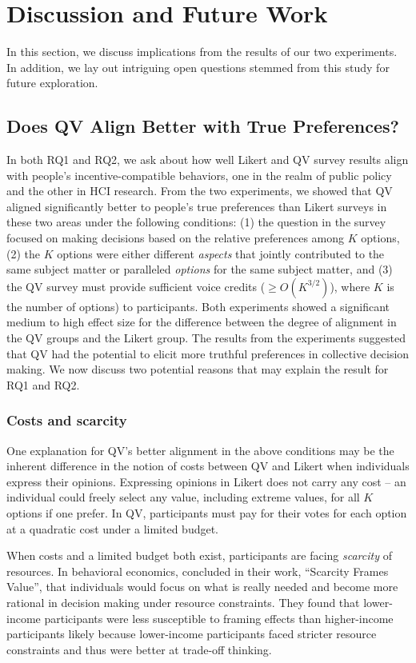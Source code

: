 \section{Discussion and Future Work} \label{discussion}
In this section, we discuss implications from the results of our two experiments. In addition, we lay out intriguing open questions stemmed from this study for future exploration.

\subsection{Does QV Align Better with True Preferences?}
In both RQ1 and RQ2, we ask about how well Likert and QV survey results align with people's incentive-compatible behaviors, one in the realm of public policy and the other in HCI research. From the two experiments, we showed that QV aligned significantly better to people's true preferences than Likert surveys in these two areas under the following conditions: (1) the question in the survey focused on making decisions based on the relative preferences among $K$ options, (2) the $K$ options were either different \textit{aspects} that jointly contributed to the same subject matter or paralleled \textit{options} for the same subject matter, and (3) the QV survey must provide sufficient voice credits ($\geq O(K^{3/2})$), where $K$ is the number of options) to participants. Both experiments showed a significant medium to high effect size for the difference between the degree of alignment in the QV groups and the Likert group. The results from the experiments suggested that QV had the potential to elicit more truthful preferences in collective decision making. We now discuss two potential reasons that may explain the result for RQ1 and RQ2.

\subsubsection{Costs and scarcity}
One explanation for QV's better alignment in the above conditions may be the inherent difference in the notion of costs between QV and Likert when individuals express their opinions. Expressing opinions in Likert does not carry any cost -- an individual could freely select any value, including extreme values, for all $K$ options if one prefer. In QV, participants must pay for their votes for each option at a quadratic cost under a limited budget. 

When costs and a limited budget both exist, participants are facing \textit{scarcity} of resources. In behavioral economics, \textcite{Shah2015a} concluded in their work, ``Scarcity Frames Value'', that individuals would focus on what is really needed and become more rational in decision making under resource constraints. They found that lower-income participants were less susceptible to framing effects than higher-income participants likely because lower-income participants faced stricter resource constraints and thus were better at trade-off thinking. 

